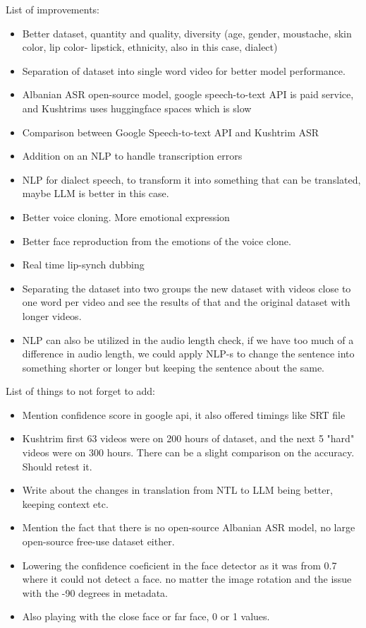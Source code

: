 \documentclass[12pt]{article}
\begin{document}
List of improvements:
\begin{itemize}
    \item Better dataset, quantity and quality, diversity (age, gender, moustache, skin color, lip color- lipstick, ethnicity, also in this case, dialect)
    \item Separation of dataset into single word video for better model performance.
    \item Albanian ASR open-source model, google speech-to-text API is paid service, and Kushtrims uses huggingface spaces which is slow
    \item Comparison between Google Speech-to-text API and Kushtrim ASR
    \item Addition on an NLP to handle transcription errors
    \item NLP for dialect speech, to transform it into something that can be translated, maybe LLM is better in this case.
    \item Better voice cloning. More emotional expression
    \item Better face reproduction from the emotions of the voice clone.
    \item Real time lip-synch dubbing
    \item Separating the dataset into two groups the new dataset with videos close to one word per video and see the results of that and the original dataset with longer videos. 
    \item NLP can also be utilized in the audio length check, if we have too much of a difference in audio length, we could apply NLP-s to change the sentence into something shorter or longer but keeping the sentence about the same.
\end{itemize}

List of things to not forget to add:
\begin{itemize}
    \item Mention confidence score in google api, it also offered timings like SRT file
    \item Kushtrim first 63 videos were on 200 hours of dataset, and the next 5 "hard" videos were on 300 hours. There can be a slight comparison on the accuracy. Should retest it.
    \item Write about the changes in translation from NTL to LLM being better, keeping context etc.
    \item Mention the fact that there is no open-source Albanian ASR model, no large open-source free-use dataset either. 
    \item Lowering the confidence coeficient in the face detector as it was from 0.7 where it could not detect a face. no matter the image rotation and the issue with the -90 degrees in metadata. 
    \item Also playing with the close face or far face, 0 or 1 values.
\end{itemize}



\end{document}
